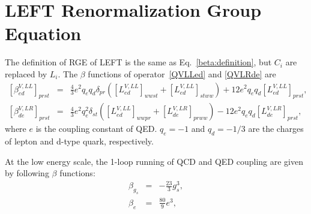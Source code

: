 \documentclass[a4paper,11pt]{article}
\begin{document}
\section{LEFT Renormalization Group Equation}\label{leftrge}

The definition of RGE of LEFT is the same as Eq.~\ref{beta:definition}, but $C_i$ are replaced by $L_i$.
The $\beta$ functions of operator~\ref{QVLLed} and \ref{QVLRde} are
\begin{eqnarray}
  \left[\beta^{V,LL}_{ed}\right]_{prst} &=& \frac{4}{3}e^2q_eq_d\delta_{pr}\left([L^{V,LL}_{ed}]_{wwst}+[L^{V,LL}_{ed}]_{stww}\right)+12e^2q_eq_d[L^{V,LL}_{ed}]_{prst},  \label{beta:VLLed} \\
  \left[\beta^{V,LR}_{de}\right]_{prst} &=& \frac{4}{3}e^2q^2_e\delta_{st}\left([L^{V,LL}_{ed}]_{wwpr}+[L^{V,LR}_{de}]_{prww}\right)-12e^2q_eq_d[L^{V,LR}_{de}]_{prst}, \label{beta:VLRde}
\end{eqnarray}
where $e$ is the coupling constant of QED. 
$q_e=-1$ and $q_d=-1/3$ are the charges of lepton and d-type quark, respectively. 

At the low energy scale, the 1-loop running of QCD and QED coupling are given by following $\beta$ functions:
\begin{eqnarray}
  \beta_{g_s} &=& -\frac{23}{3}g^3_s,  \\
  \beta_{e} &=& \frac{80}{9}e^3, 
\end{eqnarray}







		
		

		
\end{document}
